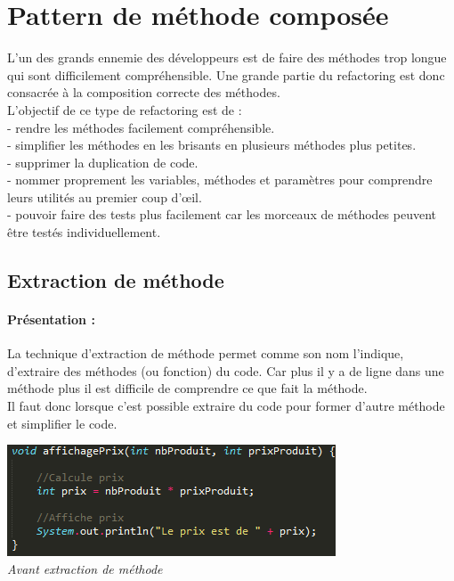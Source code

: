 \documentclass[a4paper,twoside,12pt,openright]{report}
\begin{document}
\section{Pattern de méthode composée}
L'un des grands ennemie des développeurs est de faire des méthodes trop longue qui sont difficilement compréhensible.
Une grande partie du refactoring est donc consacrée à la composition correcte des méthodes.\cite{ref5}\\

L'objectif de ce type de refactoring est de :\\
- rendre les méthodes facilement compréhensible.\\
- simplifier les méthodes en les brisants en plusieurs méthodes plus petites.\\
- supprimer la duplication de code.\\
- nommer proprement les variables, méthodes et paramètres pour comprendre leurs utilités au premier coup d'œil.\\
- pouvoir faire des tests plus facilement car les morceaux de méthodes peuvent être testés individuellement.\cite{ref6}

\newpage

\subsection{Extraction de méthode}
\paragraph{Présentation :} 
La technique d'extraction de méthode permet comme son nom l'indique, d'extraire des méthodes (ou fonction) du code. Car plus il y a de ligne dans une méthode plus il est difficile de comprendre ce que fait la méthode.\\
Il faut donc lorsque c'est possible extraire du code pour former d'autre méthode et simplifier le code.
\begin{center}
\includegraphics[scale=1]{Image/Extraction_Methode.png}\\
\itshape{Avant extraction de méthode}
\end{center}
\end{document}
